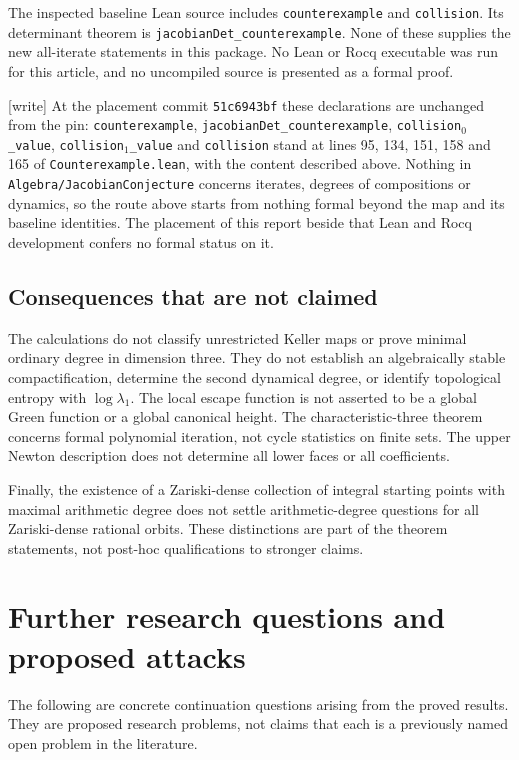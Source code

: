 \documentclass[11pt,a4paper]{article}
\numberwithin{equation}{section}
\theoremstyle{definition}
\theoremstyle{remark}
\newcommand{\wtag}{\textup{[write]}}%
\begin{document}
The inspected baseline Lean source includes \texttt{counterexample}
and \texttt{collision}. Its determinant theorem is
\texttt{jacobianDet\_counterexample}. None of these supplies the new
all-iterate statements in this package. No Lean or Rocq executable
was run for this article, and no uncompiled source is presented as
a formal proof.

\noindent\wtag{} At the placement commit \texttt{51c6943bf} these
declarations are unchanged from the pin: \texttt{counterexample},
\texttt{jacobianDet\_counterexample}, \texttt{collision}$_0$\texttt{\_value},
\texttt{collision}$_1$\texttt{\_value} and \texttt{collision} stand at
lines 95, 134, 151, 158 and 165 of \texttt{Counterexample.lean}, with the
content described above. Nothing in \texttt{Algebra/JacobianConjecture}
concerns iterates, degrees of compositions or dynamics, so the route
above starts from nothing formal beyond the map and its baseline
identities. The placement
of this report beside that Lean and Rocq development confers no formal
status on it.

\subsection{Consequences that are not claimed}
The calculations do not classify unrestricted Keller maps or prove
minimal ordinary degree in dimension three. They do not establish
an algebraically stable compactification, determine the second
dynamical degree, or identify topological entropy with
$\log\lambda_1$. The local escape function is not asserted to be
a global Green function or a global canonical height. The
characteristic-three theorem concerns formal polynomial iteration,
not cycle statistics on finite sets. The upper Newton description
does not determine all lower faces or all coefficients.

Finally, the existence of a Zariski-dense collection of integral
starting points with maximal arithmetic degree does not settle
arithmetic-degree questions for all Zariski-dense rational orbits.
These distinctions are part of the theorem statements, not
post-hoc qualifications to stronger claims.

\section{Further research questions and proposed attacks}\label{kmd:sec:questions}

The following are concrete continuation questions arising from the
proved results. They are proposed research problems, not claims
that each is a previously named open problem in the literature.
\end{document}

